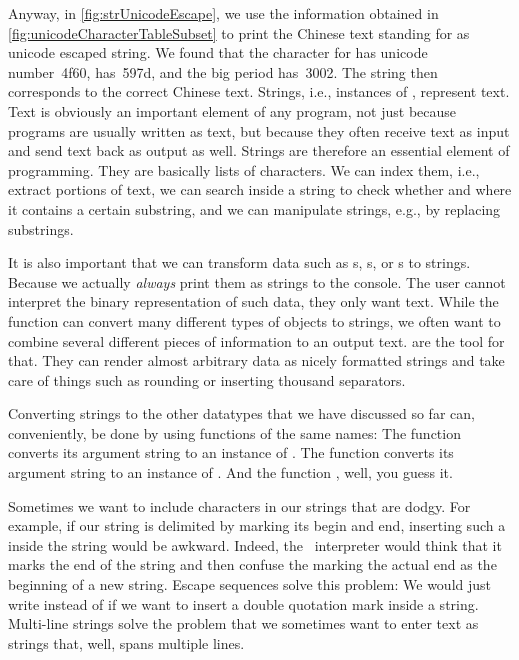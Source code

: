 Anyway, in \cref{fig:strUnicodeEscape}, we use the information obtained in \cref{fig:unicodeCharacterTableSubset} to print the Chinese text  standing for  as unicode escaped string.
We found that the character for  has unicode number~4f60,  has~597d, and the big period has~3002.
The string  then corresponds to the correct Chinese text.%
\endhsection%
%
%
Strings, i.e., instances of , represent text.
Text is obviously an important element of any program, not just because programs are usually written as text, but because they often receive text as input and send text back as output as well.
Strings are therefore an essential element of programming.
They are basically lists of characters.
We can index them, i.e., extract portions of text, we can search inside a string to check whether and where it contains a certain substring, and we can manipulate strings, e.g., by replacing substrings.

It is also important that we can transform data such as s, s, or s to strings.
Because we actually \emph{always} print them as strings to the console.
The user cannot interpret the binary representation of such data, they only want text.
While the function  can convert many different types of objects to strings, we often want to combine several different pieces of information to an output text.
 are the tool for that.
They can render almost arbitrary data as nicely formatted strings and take care of things such as rounding or inserting thousand separators.

Converting strings to the other datatypes that we have discussed so far can, conveniently, be done by using functions of the same names:
The function  converts its argument string to an instance of .
The function  converts its argument string to an instance of .
And the function , well, you guess it.

Sometimes we want to include characters in our strings that are dodgy.
For example, if our string is delimited by  marking its begin and end, inserting such a  inside the string would be awkward.
Indeed, the \python\ interpreter would think that it marks the end of the string and then confuse the  marking the actual end as the beginning of a new string.
Escape sequences solve this problem:
We would just write  instead of  if we want to insert a double quotation mark inside a string.
Multi-line strings solve the problem that we sometimes want to enter text as strings that, well, spans multiple lines.

